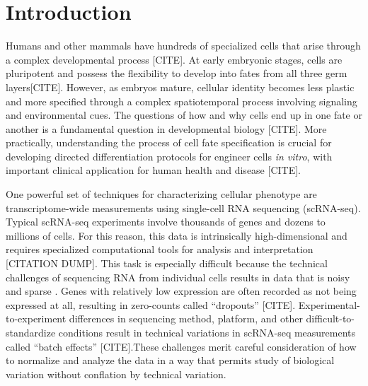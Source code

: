 \documentclass[aps,superscriptaddress, notitlepage,longbibliography]{revtex4-1}
\begin{document}
\maketitle

\section{Introduction}
Humans and other mammals have hundreds of specialized cells that arise through a complex developmental process  [CITE]. At early embryonic stages, cells are pluripotent and possess the flexibility to develop into fates from all three germ layers[CITE]. However, as embryos mature, cellular identity becomes less plastic and more specified through a complex spatiotemporal process involving signaling and environmental cues. The questions of how and why cells end up in one fate or another is a fundamental question in developmental biology [CITE]. More practically, understanding the process of cell fate specification is crucial for developing directed differentiation protocols for engineer cells \emph{in vitro}, with important clinical application for human health and disease [CITE].

One powerful set of techniques for characterizing cellular phenotype are transcriptome-wide measurements using single-cell RNA sequencing (scRNA-seq). Typical scRNA-seq experiments involve thousands of genes and dozens to millions of cells. For this reason, this data is intrinsically high-dimensional and requires specialized computational tools for analysis and interpretation [CITATION DUMP]. This task is especially difficult because the technical challenges of sequencing RNA from individual cells results in data that is noisy and sparse \cite{lahnemann_eleven_2020}. Genes with relatively low expression are often recorded as not being expressed at all, resulting in zero-counts called ``dropouts'' [CITE]. Experimental-to-experiment differences in sequencing method, platform, and other difficult-to-standardize conditions result in technical variations in scRNA-seq measurements called ``batch effects'' [CITE].These challenges merit careful consideration of how to normalize and analyze the data in a way that permits study of biological variation without conflation by technical variation.
\end{document}
